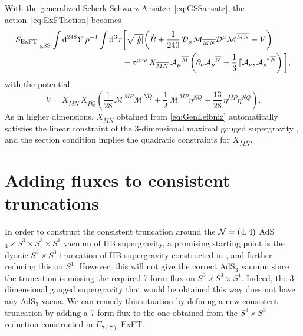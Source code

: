 \documentclass[a4paper, 11pt]{article}
\numberwithin{equation}{section}
\newcommand{\ov}[1]{\overline{#1}}
\newcommand{\En}[1]{E_{#1(#1)}}
\newcommand{\+}{\oplus}
\newcommand{\fl}[1]{\ov{#1}}
\newcommand{\M}{\ensuremath{\mathcal{M}}\xspace}
\newcommand{\A}{\ensuremath{\mathcal{A}}\xspace}
\renewcommand{\d}{\ensuremath{\mathrm{d}}\xspace}
\begin{document}
With the generalized Scherk-Schwarz Ansätze~\eqref{eq:GSSansatz}, the action~\eqref{eq:ExFTaction} becomes
\begin{equation} \label{eq:ExFTactiongSS}
	\begin{aligned}
		S_{\rm ExFT} \underset{\rm gSS}{=} \int\d^{248}Y\,\rho^{-1}\int \d^{3}x & \bigg[\sqrt{\vert\mathring{g}\vert}\bigg(\mathring{R}+\frac{1}{240}\,{\cal D}_{\mu}\M_{\fl{MN}}{\cal D}^{\mu}\M^{\fl{MN}}-V\bigg) \\
		&-\varepsilon^{\mu\nu\rho}\,X_{\fl{MN}}\,\A_{\mu}{}^{\fl{M}} \left(\partial_{\nu}\A_{\rho}{}^{\fl{N}}-\frac{1}{3}\,\llbracket\A_{\nu},\A_{\rho}\rrbracket^{\fl{N}}\right)\bigg],
	\end{aligned}
\end{equation}
with the potential
\begin{equation} \label{eq:3dpotential}
	V = X_{\fl{MN}}\,X_{\fl{PQ}}\left(\frac{1}{28}\,\M^{\fl{MP}}\M^{\fl{NQ}}+\frac{1}{2}\,\M^{\fl{MP}}\eta^{\fl{NQ}}+\frac{13}{28}\,\eta^{\fl{MP}}\eta^{\fl{NQ}}\right).
\end{equation}
As in higher dimensions, $X_{\ov{M}\ov{N}}$ obtained from \eqref{eq:GenLeibniz} automatically satisfies the linear constraint of the 3-dimensional maximal gauged supergravity \cite{Nicolai:2000sc,Nicolai:2001sv}, and the section condition implies the quadratic constraints for $X_{\ov{M}\ov{N}}$.

\section{Adding fluxes to consistent truncations} \label{s:AddFlux}
In order to construct the consistent truncation around the ${\cal N}=(4,4)$ AdS$_3 \times S^3 \times S^3 \times S^1$ vacuum of IIB supergravity, a promising starting point is the dyonic $S^3 \times S^3$ truncation of IIB supergravity constructed in \cite{Inverso:2016eet}, and further reducing this on $S^1$. However, this will not give the correct AdS$_3$ vacuum since the truncation is missing the required 7-form flux on $S^3 \times S^3 \times S^1$. Indeed, the 3-dimensional gauged supergravity that would be obtained this way does not have any AdS$_3$ vacua. We can remedy this situation by defining a new consistent truncation by adding a 7-form flux to the one obtained from the $S^3 \times S^3$ reduction constructed in $\En{7}$ ExFT.
\end{document}
